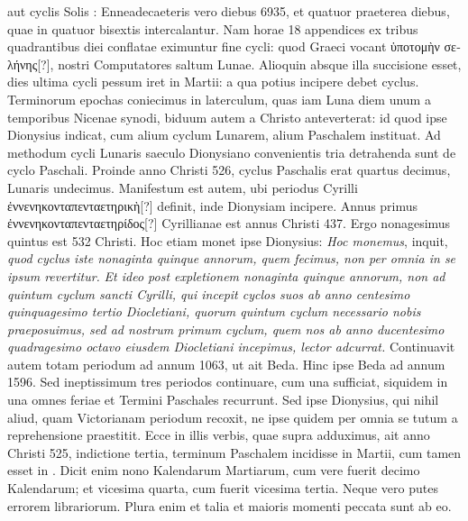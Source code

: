 aut cyclis Solis : Enneadecaeteris vero diebus
6935, et quatuor praeterea diebus, quae in
quatuor bisextis intercalantur.
Nam horae 18
appendices ex tribus quadrantibus diei conflatae
eximuntur fine cycli: quod Graeci vocant \textgreek{ὑποτομὴν
σελήνης[?]}, nostri Computatores saltum Lunae.
Alioquin absque illa succisione esset, dies
ultima cycli pessum iret in  Martii: a qua
potius incipere debet cyclus.
Terminorum epochas
coniecimus in laterculum, quas iam Luna
diem unum a temporibus Nicenae synodi, biduum
autem a Christo anteverterat: id quod
ipse Dionysius indicat, cum alium cyclum Lunarem,
alium Paschalem instituat.
Ad methodum cycli Lunaris saeculo Dionysiano convenientis
tria detrahenda sunt de cyclo Paschali.
Proinde anno Christi 526, cyclus Paschalis erat
quartus decimus, Lunaris undecimus.
Manifestum est autem, ubi periodus
 Cyrilli \textgreek{ἐννενηκονταπενταετηρικὴ[?]}
definit, inde Dionysiam incipere.
Annus primus \textgreek{ἐννενηκονταπενταετηρίδος[?]} Cyrillianae est
 annus Christi
437.
Ergo nonagesimus quintus est 532 Christi.
Hoc etiam monet
ipse Dionysius: \textit{Hoc monemus}, inquit, \textit{quod cyclus iste nonaginta
quinque annorum, quem fecimus, non per omnia in se ipsum revertitur.}
\textit{Et ideo post expletionem nonaginta quinque annorum, non ad
quintum cyclum sancti Cyrilli, qui incepit cyclos suos ab anno centesimo
quinquagesimo tertio Diocletiani, quorum quintum cyclum necessario
nobis praeposuimus, sed ad nostrum primum cyclum, quem nos
ab anno ducentesimo quadragesimo octavo eiusdem Diocletiani incepimus,
lector adcurrat.}
Continuavit autem totam periodum
ad annum 1063, ut ait Beda.
Hinc ipse Beda ad annum 1596.
Sed ineptissimum tres periodos continuare, cum una sufficiat, siquidem
in una omnes feriae et Termini Paschales recurrunt.
Sed
ipse Dionysius, qui nihil aliud, quam Victorianam periodum recoxit,
ne ipse quidem per omnia se tutum a reprehensione praestitit.
Ecce in illis verbis, quae supra adduximus,
 ait anno Christi 525, indictione
tertia, terminum Paschalem incidisse in  Martii, cum
tamen esset in .
Dicit enim nono Kalendarum Martiarum, cum
vere fuerit decimo Kalendarum; et vicesima quarta, cum fuerit vicesima
tertia.
%
Neque vero putes errorem librariorum.
Plura enim et
talia et maioris momenti peccata sunt ab eo.






























